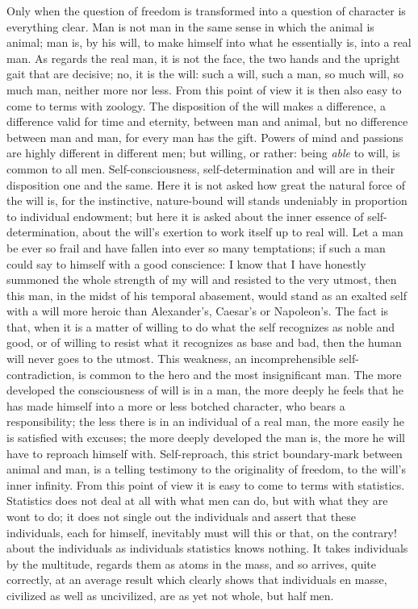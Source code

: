 \documentclass[12pt,a4paper,openany]{book}
\newcommand{\opage}[1]{\marginnote{\footnotesize\textit{[#1]}}}
\begin{document}
\setcounter{footnote}{0}%
\opage{499}Only when the question of freedom is transformed into a question of character
is everything clear. Man is not
man in the same sense in which the animal is animal; man
is, by his will, to make himself into what he essentially
is, into a real man. As regards the real man,
it is not the face, the two hands and
the upright gait that are decisive; no, it is the will:
such a will, such a man, so much will,
so much man, neither more nor less. From
this point of view it is then also easy to come to terms
with zoology. The disposition of the will makes a difference, a difference valid for time
and eternity, between man and animal,
but no difference between man and man, for
every man has the gift. Powers of mind and passions
are highly different in different men; but
willing, or rather: being \emph{able} to will, is common
to all men. Self-consciousness, self-determination
and will are in their disposition one and the same. Here it is not asked
how great the natural force of the will is, for the instinctive,
nature-bound will stands undeniably in proportion to
individual endowment; but here it is asked about the inner
essence of self-determination, about the will's exertion to
work itself up to real will. Let a man be
ever so frail and have fallen into ever so many temptations;
if such a man could say to himself with a good conscience:
I know that I have honestly summoned the whole strength of my
will and resisted to the very utmost, then
this man, in the midst of his temporal abasement, would stand
as an exalted self with a will more heroic than
Alexander's, Caesar's or Napoleon's. The fact is that, when it
is a matter of willing to do what the self recognizes as
\setcounter{footnote}{0}%
\opage{500}noble and good, or of willing to resist what it recognizes
as base and bad, then the human will never goes
to the utmost. This weakness, an incomprehensible self-contradiction,
is common to the hero and the most insignificant man.
The more developed the consciousness of will is in a
man, the more deeply he feels that he has made himself
into a more or less botched character, who bears
a responsibility; the less there is in an individual of a real
man, the more easily he is satisfied with
excuses; the more deeply developed the man is, the
more he will have to reproach himself with. Self-reproach,
this strict boundary-mark between animal and man, is a
telling testimony to the originality of freedom, to the will's
inner infinity. From this point of view it is easy
to come to terms with statistics. Statistics does not deal
at all with what men can do, but with what
they are wont to do; it does not single out the individuals
and assert that these individuals, each for himself, inevitably
must will this or that, on the contrary! about the individuals
as individuals statistics knows nothing. It takes individuals
by the multitude, regards them as atoms in the mass,
and so arrives, quite correctly, at an average result
which clearly shows that individuals en masse, civilized as
well as uncivilized, are as yet not whole, but half men.
\end{document}
